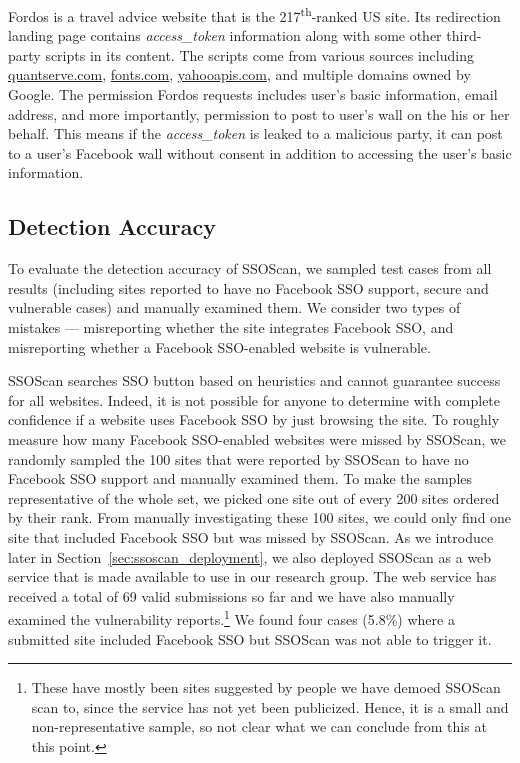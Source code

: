  Fordos is a travel advice website that is the 217\textsuperscript{th}-ranked US site.  Its redirection landing page contains \emph{access\_token} information along with some other third-party scripts in its content.  The scripts come from various sources including \url{quantserve.com}, \url{fonts.com}, \url{yahooapis.com}, and multiple domains owned by Google.  The permission Fordos requests includes user's basic information, email address, and more importantly, permission to post to user's wall on the his or her behalf. This means if the \emph{access\_token} is leaked to a malicious party, it can post to a user's Facebook wall without consent in addition to accessing the user's basic information. 


\subsection{Detection Accuracy}
\label{sec:toolEffectiveness}
To evaluate the detection accuracy of SSOScan, we sampled test cases from all results (including sites reported to have no Facebook SSO support, secure and vulnerable cases) and manually examined them.  We consider two types of mistakes --- misreporting whether the site integrates Facebook SSO, and misreporting whether a Facebook SSO-enabled website is vulnerable.  

 SSOScan searches SSO button based on heuristics and cannot guarantee success for all websites. Indeed, it is not possible for anyone to determine with complete confidence if a website uses Facebook SSO by just browsing the site.  To roughly measure how many Facebook SSO-enabled websites were missed by SSOScan, we randomly sampled the 100 sites that were reported by SSOScan to have no Facebook SSO support and manually examined them.  To make the samples representative of the whole set, we picked one site out of every 200 sites ordered by their rank.  From manually investigating these 100 sites, we could only find one site that included Facebook SSO but was missed by SSOScan.  As we introduce later in Section~\ref{sec:ssoscan_deployment}, we also deployed SSOScan as a web service that is made available to use in our research group.  The web service has received a total of 69 valid submissions so far and we have also manually examined the vulnerability reports.\footnote{These have mostly been sites suggested by people we have demoed SSOScan scan to, since the service has not yet been publicized.  Hence, it is a small and non-representative sample, so not clear what we can conclude from this at this point.}  We found four cases (5.8\%) where a submitted site included Facebook SSO but SSOScan was not able to trigger it.

